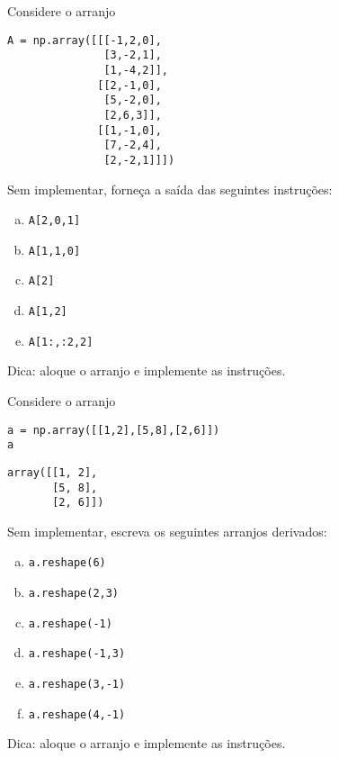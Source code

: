 \begin{exer}
  Considere o arranjo

\begin{lstlisting}
A = np.array([[[-1,2,0],
               [3,-2,1],
               [1,-4,2]],
              [[2,-1,0],
               [5,-2,0],
               [2,6,3]],
              [[1,-1,0],
               [7,-2,4],
               [2,-2,1]]])
\end{lstlisting}

Sem implementar, forneça a saída das seguintes instruções:
  \begin{enumerate}[a)]
  \item \lstinline+A[2,0,1]+
  \item \lstinline+A[1,1,0]+
  \item \lstinline+A[2]+
  \item \lstinline+A[1,2]+
  \item \lstinline+A[1:,:2,2]+
  \end{enumerate}
\end{exer}
\begin{resp}
  Dica: aloque o arranjo e implemente as instruções.
\end{resp}

\begin{exer}
  Considere o arranjo

\begin{lstlisting}
a = np.array([[1,2],[5,8],[2,6]])
a
\end{lstlisting}

\begin{verbatim}
array([[1, 2],
       [5, 8],
       [2, 6]])
\end{verbatim}

Sem implementar, escreva os seguintes arranjos derivados:
  \begin{enumerate}[a)]
  \item \lstinline+a.reshape(6)+
  \item \lstinline+a.reshape(2,3)+
  \item \lstinline+a.reshape(-1)+
  \item \lstinline+a.reshape(-1,3)+
  \item \lstinline+a.reshape(3,-1)+
  \item \lstinline+a.reshape(4,-1)+
  \end{enumerate}
\end{exer}
\begin{resp}
  Dica: aloque o arranjo e implemente as instruções.
\end{resp}


